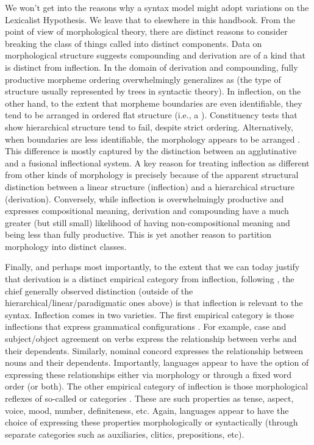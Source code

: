 \documentclass[output=paper,hidelinks]{langscibook}
\begin{document}
We won’t get into the reasons why a syntax model might adopt
variations on the Lexicalist Hypothesis.  We leave that to elsewhere
in this handbook.  From the point of view of morphological theory,
there are distinct reasons to consider breaking the class of things
called  into distinct components.  Data on morphological
structure suggests compounding
and derivation are of a kind that is distinct from inflection.   In the
domain of derivation and compounding, fully productive morpheme
ordering overwhelmingly generalizes as 
(the type of structure usually represented by trees in syntactic theory).  In inflection, on
the other hand, to the extent that morpheme boundaries are even
identifiable, they tend to be arranged in ordered flat
  structure (i.e., a ). Constituency tests that show hierarchical structure tend to fail,
despite strict ordering. Alternatively, when boundaries are less
identifiable, the morphology appears to be arranged .
This difference is mostly captured by the distinction between an
agglutinative and a fusional inflectional system.  A key reason for
treating inflection as different from other kinds of morphology is
precisely because of the apparent 
structural distinction between a linear structure (inflection) and a
hierarchical structure (derivation). Conversely, while inflection is overwhelmingly productive
and expresses compositional meaning, derivation and compounding have a
much greater (but still small) likelihood of having non-compositional
meaning and being less than fully productive.   This is yet another
reason to partition morphology into distinct classes. 

Finally, and perhaps most importantly, to the extent that we can today
justify that derivation is a distinct empirical category from
inflection, following \citet{anderson82-wm}, the chief generally
observed distinction (outside of the hierarchical/linear/paradigmatic
ones above) is that inflection is relevant to the syntax.  Inflection
comes in two varieties.  The first empirical category is those
inflections that express grammatical configurations \citep[][]{booij96}.  For example,
case and subject/object agreement on verbs express the relationship
between verbs and their dependents.  Similarly, nominal concord
expresses the relationship between nouns and their dependents.
Importantly, languages appear to have the option of expressing these
relationships either via morphology or through a fixed word order (or
both).  The other empirical category of inflection is those
morphological reflexes of so-called  or 
categories \citep[][]{booij96}.  These are such properties as tense, aspect, voice, mood,
number, definiteness, etc.  Again, languages appear to have the choice
of expressing these properties morphologically or syntactically
(through separate categories such as auxiliaries, clitics, prepositions, etc).
\end{document}
